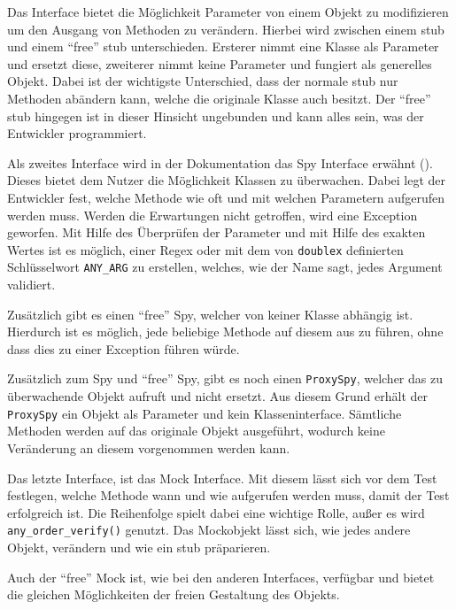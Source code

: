 Das Interface bietet die Möglichkeit Parameter von einem Objekt zu modifizieren
um den Ausgang von Methoden zu verändern. Hierbei wird zwischen einem \Gls{stub}
und einem "`free"' \Gls{stub} unterschieden. Ersterer nimmt eine Klasse als
Parameter und ersetzt diese, zweiterer nimmt keine Parameter und fungiert als
generelles Objekt. Dabei ist der wichtigste Unterschied, dass der normale
\Gls{stub} nur Methoden abändern kann, welche die originale Klasse auch 
besitzt. Der "`free"' \Gls{stub} hingegen ist in dieser Hinsicht ungebunden und 
kann alles sein, was der Entwickler programmiert.
\newline

Als zweites Interface wird in der Dokumentation das Spy Interface erwähnt
(\cite{doublex:docs:1.8.1}). Dieses bietet dem Nutzer die Möglichkeit Klassen zu
überwachen. Dabei legt der Entwickler fest, welche Methode wie oft und mit
welchen Parametern aufgerufen werden muss. Werden die Erwartungen nicht
getroffen, wird eine Exception geworfen. Mit Hilfe des Überprüfen der Parameter 
und mit Hilfe des exakten Wertes ist es möglich, einer Regex oder mit dem von
\lstinline{doublex} definierten Schlüsselwort \lstinline{ANY_ARG} zu erstellen, 
welches, wie der Name sagt, jedes Argument validiert.

Zusätzlich gibt es einen "`free"' Spy, welcher von keiner
Klasse abhängig ist. Hierdurch ist es möglich, jede beliebige Methode auf
diesem aus zu führen, ohne dass dies zu einer Exception führen würde.
\newline

Zusätzlich zum Spy und "`free"' Spy, gibt es noch einen \lstinline{ProxySpy},
welcher das zu überwachende Objekt aufruft und nicht ersetzt. Aus diesem Grund
erhält der \lstinline{ProxySpy} ein Objekt als Parameter und kein
Klasseninterface. Sämtliche Methoden werden auf das originale Objekt ausgeführt,
wodurch keine Veränderung an diesem vorgenommen werden kann.
\newline

Das letzte Interface, ist das Mock Interface. Mit diesem lässt sich vor dem Test
festlegen, welche Methode wann und wie aufgerufen werden muss, damit der Test
erfolgreich ist. Die Reihenfolge spielt dabei eine wichtige Rolle, außer es wird
\lstinline{any_order_verify()} genutzt. Das Mockobjekt lässt sich, wie
jedes andere Objekt, verändern und wie ein \Gls{stub} präparieren.

Auch der "`free"' Mock ist, wie bei den anderen Interfaces, verfügbar und bietet
die gleichen Möglichkeiten der freien Gestaltung des Objekts.
\newline

